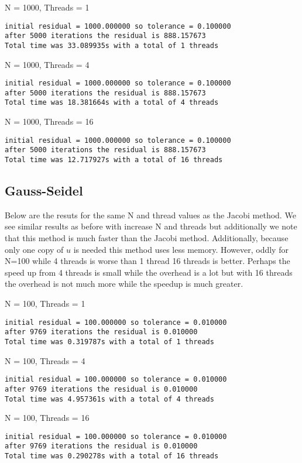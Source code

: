 \documentclass{article}
\begin{document}
N = 1000, Threads = 1
\begin{verbatim}
initial residual = 1000.000000 so tolerance = 0.100000
after 5000 iterations the residual is 888.157673
Total time was 33.089935s with a total of 1 threads
\end{verbatim}

N = 1000, Threads = 4
\begin{verbatim}
initial residual = 1000.000000 so tolerance = 0.100000
after 5000 iterations the residual is 888.157673
Total time was 18.381664s with a total of 4 threads
\end{verbatim}

N = 1000, Threads = 16
\begin{verbatim}
initial residual = 1000.000000 so tolerance = 0.100000
after 5000 iterations the residual is 888.157673
Total time was 12.717927s with a total of 16 threads
\end{verbatim}



\subsection*{Gauss-Seidel}
Below are the resuts for the same N and thread values as the Jacobi method. We see similar results as before with increase N and threads but additionally we note that this method is much faster than the Jacobi method. Additionally, because only one copy of $u$ is needed this method uses less memory. However, oddly for N=100 while 4 threads is worse than 1 thread 16 threads is better. Perhaps the speed up from 4 threads is small while the overhead is a lot but with 16 threads the overhead is not much more while the speedup is much greater.

N = 100, Threads = 1
\begin{verbatim}
initial residual = 100.000000 so tolerance = 0.010000
after 9769 iterations the residual is 0.010000
Total time was 0.319787s with a total of 1 threads
\end{verbatim}

N = 100, Threads = 4
\begin{verbatim}
initial residual = 100.000000 so tolerance = 0.010000
after 9769 iterations the residual is 0.010000
Total time was 4.957361s with a total of 4 threads
\end{verbatim}

N = 100, Threads = 16
\begin{verbatim}
initial residual = 100.000000 so tolerance = 0.010000
after 9769 iterations the residual is 0.010000
Total time was 0.290278s with a total of 16 threads
\end{verbatim}
\end{document}

